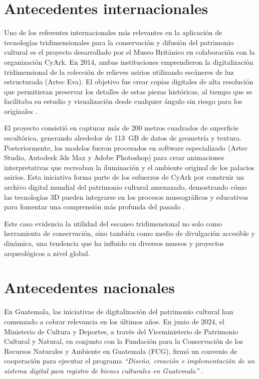 
\section{Antecedentes internacionales}

Uno de los referentes internacionales más relevantes en la aplicación de tecnologías tridimensionales para la conservación y difusión del patrimonio cultural es el proyecto desarrollado por el Museo Británico en colaboración con la organización CyArk. En 2014, ambas instituciones emprendieron la digitalización tridimensional de la colección de relieves asirios utilizando escáneres de luz estructurada (Artec Eva). El objetivo fue crear copias digitales de alta resolución que permitieran preservar los detalles de estas piezas históricas, al tiempo que se facilitaba su estudio y visualización desde cualquier ángulo sin riesgo para los originales \cite{Artec2015}.

El proyecto consistió en capturar más de 200 metros cuadrados de superficie escultórica, generando alrededor de 113~GB de datos de geometría y textura. Posteriormente, los modelos fueron procesados en software especializado (Artec Studio, Autodesk 3ds Max y Adobe Photoshop) para crear animaciones interpretativas que recreaban la iluminación y el ambiente original de los palacios asirios. Esta iniciativa forma parte de los esfuerzos de CyArk por construir un archivo digital mundial del patrimonio cultural amenazado, demostrando cómo las tecnologías 3D pueden integrarse en los procesos museográficos y educativos para fomentar una comprensión más profunda del pasado \cite{Artec2015}.

Este caso evidencia la utilidad del escaneo tridimensional no solo como herramienta de conservación, sino también como medio de divulgación accesible y dinámica, una tendencia que ha influido en diversos museos y proyectos arqueológicos a nivel global.

\section{Antecedentes nacionales}

En Guatemala, las iniciativas de digitalización del patrimonio cultural han comenzado a cobrar relevancia en los últimos años. En junio de 2024, el Ministerio de Cultura y Deportes, a través del Viceministerio de Patrimonio Cultural y Natural, en conjunto con la Fundación para la Conservación de los Recursos Naturales y Ambiente en Guatemala (FCG), firmó un convenio de cooperación para ejecutar el programa \emph{“Diseño, creación e implementación de un sistema digital para registro de bienes culturales en Guatemala”} \cite{MCD2024}. 


